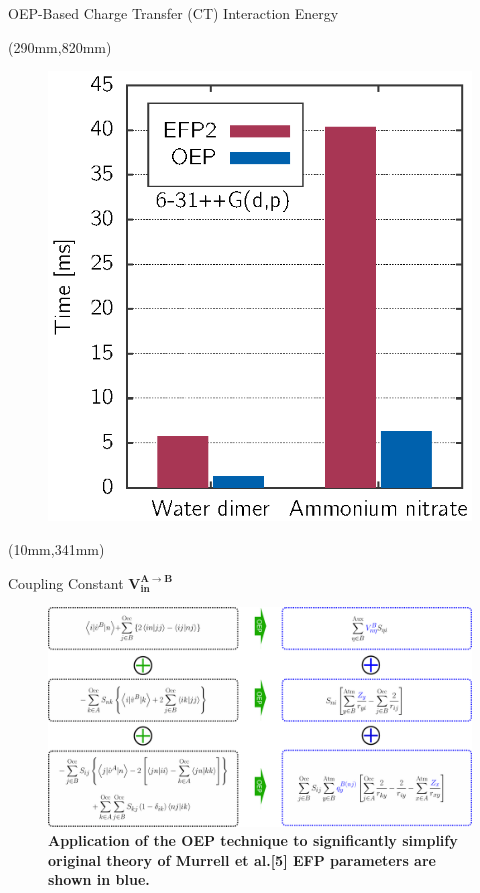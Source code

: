 \documentclass[final]{beamer} %
\begin{document}
\begin{frame}{OEP-Based Charge Transfer (CT) Interaction Energy}
\begin{textblock*}{340mm}(290mm,820mm)
\begin{figure}
\includegraphics[width=1.0\textwidth]{fig-2.eps}
\end{figure}
\end{textblock*}


\begin{textblock*}{820mm}(10mm,341mm)
\begin{exampleblock}{Coupling Constant $\boldsymbol{ V_{in}^{A\rightarrow B} } $}
\begin{figure}
\includegraphics[width=1.0\textwidth]{scheme.eps}
\caption{\bf Application of the OEP technique to significantly simplify original theory of Murrell et al.[5] EFP parameters
are shown in blue.}
\end{figure}
\end{exampleblock}
\end{textblock*}


\end{frame}
\end{document}
